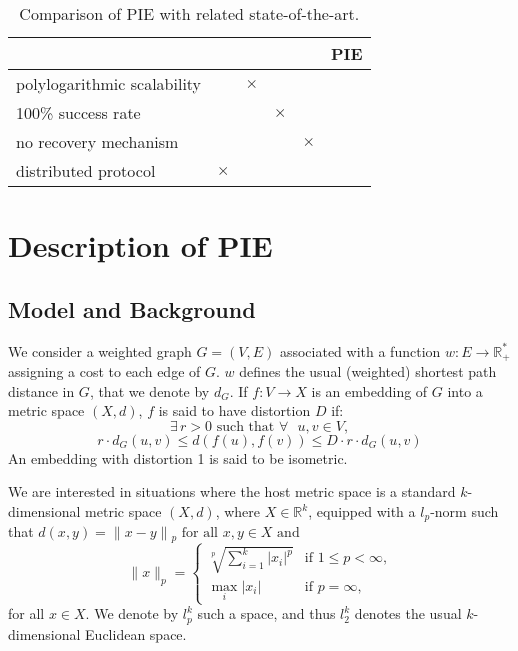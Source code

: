 \documentclass[conference]{IEEEtran}
\begin{document}
\begin{table}[htb]
    \centering
        \begin{tabular}{|l|c|c|c|c|c|}
        \hline
        & \cite{brady} & \cite{thorup:compact,mao:S4,singla2010} & \cite{Krioukov:sustaining} & \cite{Pei:greedy} & PIE\\
        \hline
	polylogarithmic scalability & \checkmark & $\times$ & \checkmark & \checkmark & \checkmark\\
	100\% success rate & \checkmark & \checkmark & $\times$ & \checkmark & \checkmark\\
	no recovery mechanism & \checkmark & \checkmark & \checkmark & $\times$ & \checkmark\\
	distributed protocol & $\times$ & \checkmark & \checkmark & \checkmark & \checkmark\\
	\hline
        \end{tabular}
	\caption{Comparison of PIE with related state-of-the-art.}
	\label{table:soa}
\end{table}
\vspace {-2em}

\section{Description of PIE}
\label{sec:pie}

\subsection{Model and Background}
\label{sec:bm}
We consider a weighted graph $G = (V,E)$ associated with a function $w : E \rightarrow \mathbb{R}_+^*$ assigning a cost to each edge of $G$. $w$ defines the usual (weighted) shortest path distance in $G$, that we denote by $d_G$. If $f : V \rightarrow X$ is an embedding of $G$ into a metric space $(X,d)$, $f$ is said to have distortion $D$ if: \begin{equation*}
  \exists{}\, r > 0 \text{ such that } \forall \text{ } u,v \in V,
 \end{equation*}
 \begin{equation*}
  r \cdotp d_G(u,v) \leq d(f(u), f(v)) \leq D \cdotp r \cdotp d_G(u,v)
 \end{equation*}
An embedding with distortion 1 is said to be isometric.

We are interested in situations where the host metric space is a standard $k$-dimensional metric space $(X,d)$, where $X \in \mathbb{R}^k$, equipped with a $l_p$-norm such that $d(x,y) = \lVert x - y \rVert{}_p\text{ for all }x,y \in X \text{ and}$
\begin{equation*}
  \lVert x \rVert_p = \begin{cases}
  \sqrt[p]{\sum_{i = 1}^k \lvert x_i \rvert^p} & \text{if } 1 \leq p < \infty \text{,}
  \\
  \max_i \lvert x_i \rvert & \text{if } p = \infty \text{,}
  \end{cases}
\end{equation*}
for all $x \in X$. We denote by $l_p^k$ such a space, and thus $l_2^k$ denotes the usual $k$-dimensional Euclidean space.
\end{document}
